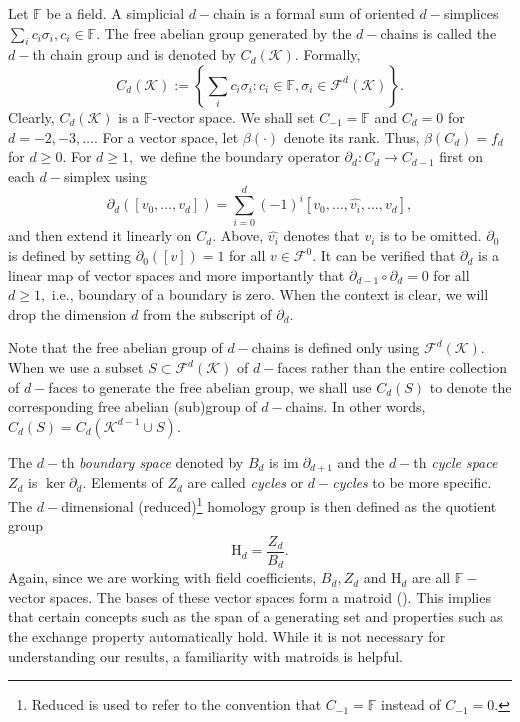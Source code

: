 \documentclass[12pt]{amsart}
\newcommand{\red}[1]{\textcolor{red}{#1}}
\newcommand{\gt}[1]{\textcolor{blue}{#1}}
\newcommand{\remove}[1]{}
\renewcommand{\red}[1]{#1}
\renewcommand{\gt}[1]{#1}
\numberwithin{equation}{section}
\numberwithin{theorem}{section}
\newcommand{\be}{\begin{equation}}
\newcommand{\ee}{\end{equation}}
\newcommand{\To}{\longrightarrow}
\newcommand{\bdr}{\partial}
\newcommand{\Hg}{\mathrm{H}}
\newcommand{\im}{\mathrm{im}\;}
\newcommand{\1}{\mathbf{1}}
\def\F{\mathcal{F}}
\def\K{\mathcal{K}}
\def\bF{\mathbb{F}}
\begin{document}
Let $\bF$ be a field. A simplicial $d-$chain is a formal sum of oriented $d-$simplices $\sum\limits_{i} c_i \sigma_i, c_i \in \bF.$ The free abelian group generated by the $d-$chains \gt{is called the $d-$th chain group and is denoted by  $C_d(\K).$ Formally,} 
%
\[
C_d(\K) := \left\{ \sum_ic_i \sigma_i : c_i \in \bF, \sigma_i \in \F^d(\K) \right\}.
\]
%
Clearly, $C_d(\K)$ is a $\bF$-vector space. We shall set $C_{-1} = \bF$ and $C_d = 0$ for $d = -2,-3,\ldots$. For a vector space, let $\beta(\cdot)$ denote its rank. Thus, $\beta(C_d) = f_d$ for $d \geq 0$. For $d \geq 1, $ we define the boundary operator $\bdr_d : C_d \To C_{d - 1}$ first on each $d-$simplex using
%
$$ \bdr_d([v_0, \ldots, v_d]) = \sum_{i=0}^d(-1)^i[v_0,\ldots,\hat{v_i},\ldots,v_d],$$
%
and then extend it linearly on $C_d.$ Above, $\hat{v_i}$ denotes that $v_i$ is to be omitted. $\bdr_0$ is defined by setting $\bdr_0([v]) = 1$ for all $v \in \F^0$. It can be verified that $\bdr_d$ is a linear map of vector spaces and more importantly that $\bdr_{d-1} \circ \bdr_d = 0$ for all $d \geq 1,$ i.e., boundary of a boundary is zero. When the context is clear, we will drop the dimension $d$ from the subscript of $\partial_d.$

Note that the free abelian group of $d-$chains is defined only using $\F^d(\K)$. When we use a subset $S \subset \F^d(\K)$ of $d-$faces rather than the entire collection of $d-$faces to generate the free abelian group, we shall use $C_d(S)$ to denote the corresponding free abelian (sub)group of $d-$chains. In other words, $C_d(S) = C_d(\K^{d-1} \cup S)$. \remove{Also, for a $d-$chain $\sum_i a_i \sigma_i$, the support denoted as $supp(\sum_i a_i \sigma_i)$ is $\{\sigma_i : a_i \neq 0\} \subset \F^d$. For  $\mathbb{F} = \mathbb{Z}_2$, the support characterizes the $d-$chain.}

The $d-$th {\em boundary space} denoted by $B_d$ is $\im \bdr_{d + 1}$ and the $d-$th {\em cycle space} $Z_d$ is $\ker \bdr_d$.  Elements of $Z_d$ are called {\em cycles} or {\em $d-$cycles} to be more specific. The $d-$dimensional (reduced)\footnote{Reduced is used to refer to the convention that $C_{-1} = \bF$ instead of $C_{-1} = 0$.} homology group is then defined as the quotient group
%
\be
\label{eqn:hom_gp}
\Hg_d = \frac{Z_d}{B_{d}}.
\ee
%	
Again, since we are working with field coefficients, $B_d,Z_d$ and $\Hg_d$ are all $\bF-$vector spaces. \red{The bases of these vector spaces form a matroid (\cite{Oxley03,Welsh76}). This implies that certain concepts such as the span of a generating set and properties such as the exchange property automatically hold. While it is not necessary for understanding our results, a familiarity with matroids is helpful.}
\end{document}
